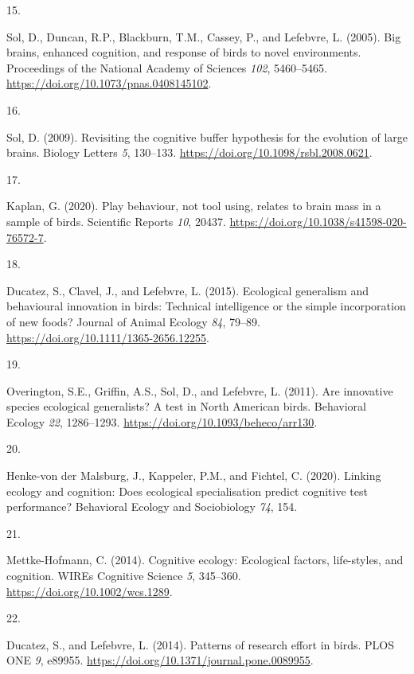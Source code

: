 \documentclass[
  man, donotrepeattitle,floatsintext]{apa6}
\newlength{\cslhangindent}
\newlength{\csllabelwidth}
\newlength{\cslentryspacingunit} %
\newenvironment{CSLReferences}[2] %
 {%
  \setlength{\parindent}{0pt}
  \ifodd #1
  \let\oldpar\par
  \def\par{\hangindent=\cslhangindent\oldpar}
  \fi
  \setlength{\parskip}{#2\cslentryspacingunit}
 }%
 {}
\newcommand{\CSLLeftMargin}[1]{\parbox[t]{\csllabelwidth}{#1}}
\newcommand{\CSLRightInline}[1]{\parbox[t]{\linewidth - \csllabelwidth}{#1}\break}
\begin{document}
\begin{CSLReferences}{0}{0}
\leavevmode{}%
\CSLLeftMargin{15. }%
\CSLRightInline{Sol, D., Duncan, R.P., Blackburn, T.M., Cassey, P., and Lefebvre, L. (2005). Big brains, enhanced cognition, and response of birds to novel environments. Proceedings of the National Academy of Sciences \emph{102}, 5460--5465. \url{https://doi.org/10.1073/pnas.0408145102}.}

\leavevmode{}%
\CSLLeftMargin{16. }%
\CSLRightInline{Sol, D. (2009). Revisiting the cognitive buffer hypothesis for the evolution of large brains. Biology Letters \emph{5}, 130--133. \url{https://doi.org/10.1098/rsbl.2008.0621}.}

\leavevmode{}%
\CSLLeftMargin{17. }%
\CSLRightInline{Kaplan, G. (2020). Play behaviour, not tool using, relates to brain mass in a sample of birds. Scientific Reports \emph{10}, 20437. \url{https://doi.org/10.1038/s41598-020-76572-7}.}

\leavevmode{}%
\CSLLeftMargin{18. }%
\CSLRightInline{Ducatez, S., Clavel, J., and Lefebvre, L. (2015). Ecological generalism and behavioural innovation in birds: Technical intelligence or the simple incorporation of new foods? Journal of Animal Ecology \emph{84}, 79--89. \url{https://doi.org/10.1111/1365-2656.12255}.}

\leavevmode{}%
\CSLLeftMargin{19. }%
\CSLRightInline{Overington, S.E., Griffin, A.S., Sol, D., and Lefebvre, L. (2011). Are innovative species ecological generalists? A test in {N}orth {A}merican birds. Behavioral Ecology \emph{22}, 1286--1293. \url{https://doi.org/10.1093/beheco/arr130}.}

\leavevmode{}%
\CSLLeftMargin{20. }%
\CSLRightInline{Henke-von der Malsburg, J., Kappeler, P.M., and Fichtel, C. (2020). Linking ecology and cognition: Does ecological specialisation predict cognitive test performance? Behavioral Ecology and Sociobiology \emph{74}, 154.}

\leavevmode{}%
\CSLLeftMargin{21. }%
\CSLRightInline{Mettke-Hofmann, C. (2014). Cognitive ecology: Ecological factors, life-styles, and cognition. WIREs Cognitive Science \emph{5}, 345--360. \url{https://doi.org/10.1002/wcs.1289}.}

\leavevmode{}%
\CSLLeftMargin{22. }%
\CSLRightInline{Ducatez, S., and Lefebvre, L. (2014). Patterns of research effort in birds. PLOS ONE \emph{9}, e89955. \url{https://doi.org/10.1371/journal.pone.0089955}.}


\end{CSLReferences}
\end{document}
